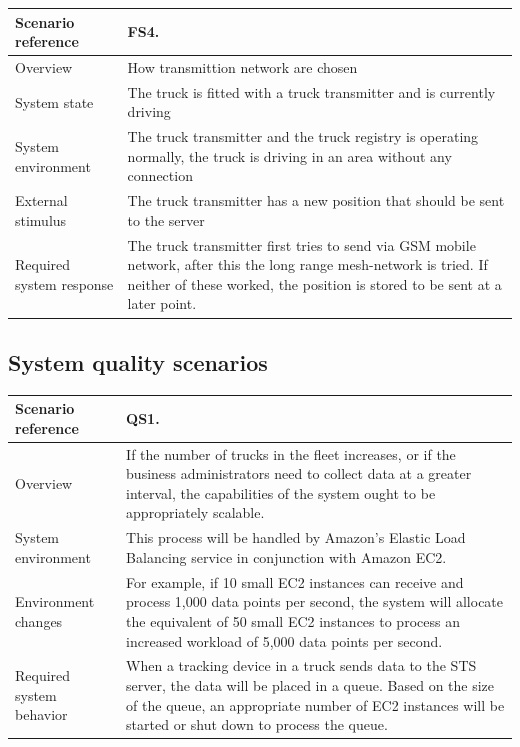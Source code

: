 \documentclass[a4paper,11pt]{report}
\begin{document}
\begin{center}
  \begin{tabular}[h!]{| >{\columncolor{gray}}p{} | p{} |}
    \hline
    Scenario reference & FS4. \\
    \hline
    Overview & How transmittion network are chosen \\
    \hline
    System state & The truck is fitted with a truck transmitter and is currently driving\\
    \hline
    System environment & The truck transmitter and the truck registry is operating normally, the truck is driving in an area without any connection\\
    \hline
    External stimulus & The truck transmitter has a new position that should be sent to the server \\
    \hline
    Required system response & The truck transmitter first tries to send via GSM mobile network, after this the long range mesh-network is tried. If neither of these worked, the position is stored to be sent at a later point. \\
    \hline
  \end{tabular}
\end{center}

\subsection{System quality scenarios}
\label{sec:syst-qual-scen}

\begin{center}
  \begin{tabular}[h!]{| >{\columncolor{gray}}p{} | p{} |}
    \hline
    Scenario reference & QS1. \\
    \hline
    Overview & If the number of trucks in the fleet increases, or if the business
    administrators need to collect data at a greater interval, the capabilities
    of the system ought to be appropriately scalable.\\
    \hline
    System environment & This process will be handled
    by Amazon's Elastic Load Balancing service in conjunction with Amazon EC2.\\
    \hline
    Environment changes & For example, if 10 small EC2
    instances can receive and process 1,000 data points per second, the system will
    allocate the equivalent of 50 small EC2 instances to process an increased
    workload of 5,000 data points per second.\\
    \hline
    Required system behavior & When a tracking device in
    a truck sends data to the STS server, the data will be placed in a queue.
    Based on the size of the queue, an appropriate number of EC2 instances will
    be started or shut down to process the queue.\\
    \hline
  \end{tabular}
\end{center}
\end{document}
